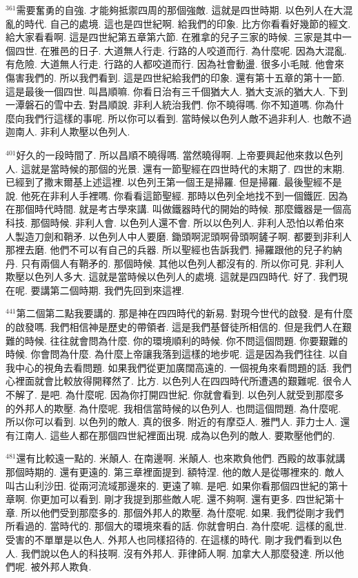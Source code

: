 \documentclass{book}
\begin{document}
$^{361}$需要奮勇的自強.
才能夠抵禦四周的那個強敵.
這就是四世時期.
以色列人在大混亂的時代.
自己的處境.
這也是四世紀啊.
給我們的印象.
比方你看看好幾節的經文.
給大家看看啊.
這是四世紀第五章第六節.
在雅拿的兒子三家的時候.
三家是其中一個四世.
在雅邑的日子.
大道無人行走.
行路的人咬道而行.
為什麼呢.
因為大混亂.
有危險.
大道無人行走.
行路的人都咬道而行.
因為社會動盪.
很多小毛賊.
他會來傷害我們的.
所以我們看到.
這是四世紀給我們的印象.
還有第十五章的第十一節.
這是最後一個四世.
叫昌順嘛.
你看日治有三千個猶大人.
猶大支派的猶大人.
下到一潭磐石的雪中去.
對昌順說.
非利人統治我們.
你不曉得嗎.
你不知道嗎.
你為什麼向我們行這樣的事呢.
所以你可以看到.
當時候以色列人敵不過非利人.
也敵不過迦南人.
非利人欺壓以色列人.

$^{401}$好久的一段時間了.
所以昌順不曉得嗎.
當然曉得啊.
上帝要興起他來救以色列人.
這就是當時候的那個的光景.
還有一節聖經在四世時代的末期了.
四世的末期.
已經到了撒末爾基上述這裡.
以色列王第一個王是掃羅.
但是掃羅.
最後聖經不是說.
他死在非利人手裡嗎.
你看看這節聖經.
那時以色列全地找不到一個鐵匠.
因為在那個時代時間.
就是考古學來講.
叫做鐵器時代的開始的時候.
那麼鐵器是一個高科技.
那個時候.
非利人會.
以色列人還不會.
所以以色列人.
非利人恐怕以希伯來人製造刀劍和鞘矛.
以色列人中人要磨.
鋤頭啊泥頭啊骨頭啊鏟子啊.
都要到非利人那裡去磨.
他們不可以有自己的兵器.
所以聖經也告訴我們.
掃羅跟他的兒子約納丹.
只有兩個人有鞘矛的.
那個時候.
其他以色列人都沒有的.
所以你可見.
非利人欺壓以色列人多大.
這就是當時候以色列人的處境.
這就是四四時代.
好了.
我們現在呢.
要講第二個時期.
我們先回到來這裡.

$^{441}$第二個第二點我要講的.
那是神在四四時代的新易.
對現今世代的啟發.
是有什麼的啟發嗎.
我們相信神是歷史的帶領者.
這是我們基督徒所相信的.
但是我們人在艱難的時候.
往往就會問為什麼.
你的環境順利的時候.
你不問這個問題.
你要艱難的時候.
你會問為什麼.
為什麼上帝讓我落到這樣的地步呢.
這是因為我們往往.
以自我中心的視角去看問題.
如果我們從更加廣闊高遠的.
一個視角來看問題的話.
我們心裡面就會比較放得開釋然了.
比方.
以色列人在四四時代所遭遇的艱難呢.
很令人不解了.
是吧.
為什麼呢.
因為你打開四世紀.
你就會看到.
以色列人就受到那麼多的外邦人的欺壓.
為什麼呢.
我相信當時候的以色列人.
也問這個問題.
為什麼呢.
所以你可以看到.
以色列的敵人.
真的很多.
附近的有摩亞人.
雅門人.
菲力士人.
還有江南人.
這些人都在那個四世紀裡面出現.
成為以色列的敵人.
要欺壓他們的.

$^{481}$還有比較遠一點的.
米顛人.
在南邊啊.
米顛人.
也來欺負他們.
西殿的故事就講那個時期的.
還有更遠的.
第三章裡面提到.
額特涅.
他的敵人是從哪裡來的.
敵人叫古山利沙田.
從兩河流域那邊來的.
更遠了嘛.
是吧.
如果你看那個四世紀的第十章啊.
你更加可以看到.
剛才我提到那些敵人呢.
還不夠啊.
還有更多.
四世紀第十章.
所以他們受到那麼多的.
那個外邦人的欺壓.
為什麼呢.
如果.
我們從剛才我們所看過的.
當時代的.
那個大的環境來看的話.
你就會明白.
為什麼呢.
這樣的亂世.
受害的不單單是以色人.
外邦人也同樣招待的.
在這樣的時代.
剛才我們看到以色人.
我們說以色人的科技啊.
沒有外邦人.
菲律師人啊.
加拿大人那麼發達.
所以他們呢.
被外邦人欺負.
\end{document}
